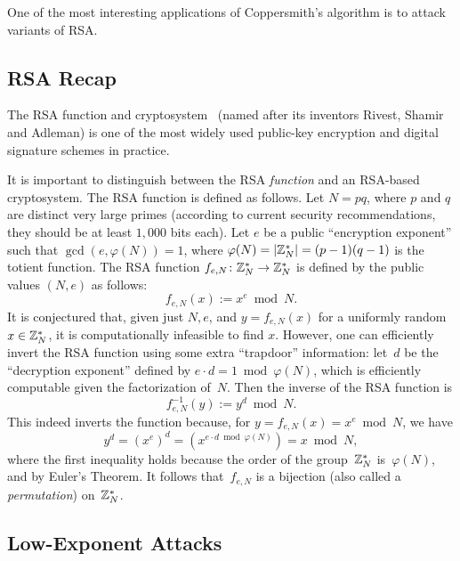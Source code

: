 \documentclass[11pt]{article}
\begin{document}
One of the most interesting applications of Coppersmith's algorithm is
to attack variants of RSA.

\subsection{RSA Recap}
\label{sec:rsa-recap}

The RSA function and cryptosystem~\cite{DBLP:journals/cacm/RivestSA78}
(named after its inventors Rivest, Shamir and Adleman) is one of the
most widely used public-key encryption and digital signature schemes
in practice.

It is important to distinguish between the RSA \emph{function} and an
RSA-based cryptosystem. The RSA function is defined as follows. Let
$N=pq$, where $p$ and $q$ are distinct very large primes (according to
current security recommendations, they should be at least $1{,}000$
bits each). Let $e$ be a public ``encryption exponent'' such that
$\gcd(e,\varphi(N))=1$, where
$\varphi(N) = \lvert\mathbb{Z}_{N}^{*}\rvert = (p-1)(q-1)$ is the totient function.
The RSA function $f_{e,N} \colon \mathbb{Z}_{N}^{*} \to \mathbb{Z}_{N}^{*}$ is defined
by the public values $(N,e)$ as follows:
\begin{equation}
  \label{eq:rsa}
  f_{e,N}(x) := x^{e} \bmod N.
\end{equation}
It is conjectured that, given just $N,e$, and $y=f_{e,N}(x)$ for a
uniformly random $x \in \mathbb{Z}_{N}^{*}$, it is computationally infeasible
to find $x$. However, one can efficiently invert the RSA function
using some extra ``trapdoor'' information: let~$d$ be the ``decryption
exponent'' defined by $e \cdot d=1 \bmod \varphi(N)$, which is
efficiently computable given the factorization of~$N$. Then the
inverse of the RSA function is
\begin{equation}
  \label{eq:rsa-inv}
  f_{e,N}^{-1}(y) := y^{d} \bmod N.
\end{equation}
This indeed inverts the function because, for
$y=f_{e,N}(x) = x^{e} \bmod N$, we have
\[ y^d=(x^e)^d = (x^{e \cdot d \bmod \varphi(N)}) = x \bmod N, \]
where the first inequality holds because the order of the
group~$\mathbb{Z}_{N}^{*}$ is~$\varphi(N)$, and by Euler's Theorem. It follows
that~$f_{e,N}$ is a bijection (also called a \emph{permutation})
on~$\mathbb{Z}_{N}^{*}$.

\subsection{Low-Exponent Attacks}
\label{sec:low-exponent-attacks}
\end{document}
